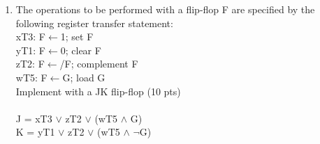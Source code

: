 \documentclass[12pt]{article}
\begin{document}
\begin{enumerate}
	\item The operations to be performed with a flip-flop F are specified by the following register transfer statement:\\
	xT3: F$\leftarrow$1; set F\\
	yT1: F$\leftarrow$0; clear F\\
	zT2: F$\leftarrow$/F; complement F\\
	wT5: F$\leftarrow$G; load G\\
	Implement with a JK flip-flop (10 pts)\\\\
	J = xT3 $\lor$ zT2 $\lor$ (wT5 $\land$ G)\\
	K = yT1 $\lor$ zT2 $\lor$ (wT5 $\land$ $\neg$G)
    
\end{enumerate}
\end{document}
